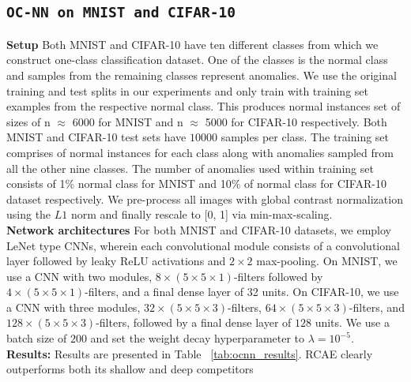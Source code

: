 \subsection{\tt OC-NN on MNIST and CIFAR-10}
\textbf{Setup}
Both MNIST and CIFAR-10  have ten different classes from which we construct one-class classification dataset.  One of the classes is the normal class and
samples from the remaining classes represent anomalies. We use the original training and test splits in our
experiments and only train with training set examples from
the respective normal class. This produces normal instances set of sizes
of n $\approx$ 6000 for MNIST and n $\approx$ 5000 for CIFAR-10 respectively.
Both MNIST and CIFAR-10 test sets have $10000$ samples per class.
The training set comprises of normal instances for each class along with anomalies sampled from
all the other nine classes. The number of anomalies used within training set consists of 1\% normal class for MNIST and  10\% of normal class for CIFAR-10 dataset respectively. We pre-process all images with global contrast normalization using the $L1$
norm and finally rescale to [0, 1] via min-max-scaling.\\
\textbf{Network architectures} For both MNIST and CIFAR-10 datasets, we employ LeNet type
CNNs, wherein each convolutional module consists of a convolutional layer followed by leaky ReLU activations and $2 \times 2$ max-pooling. On MNIST, we use a CNN with two modules, $8\times(5\times5\times1)$-filters followed by $4\times(5\times5\times1)$-filters, and a final dense layer of 32 units. On CIFAR-10,
we use a CNN with three modules, $32 \times (5 \times 5 \times3)$-filters,
$64\times(5\times5\times3)$-filters, and $128\times(5\times5\times3)$-filters, followed
by a final dense layer of $128$ units. We use a batch size of
$200$ and set the weight decay hyperparameter to $ \lambda= 10^{ - 5}$.\\
{\textbf{Results:}}
Results are presented in Table ~\ref{tab:ocnn_results}. RCAE
clearly outperforms both its shallow and deep competitors
